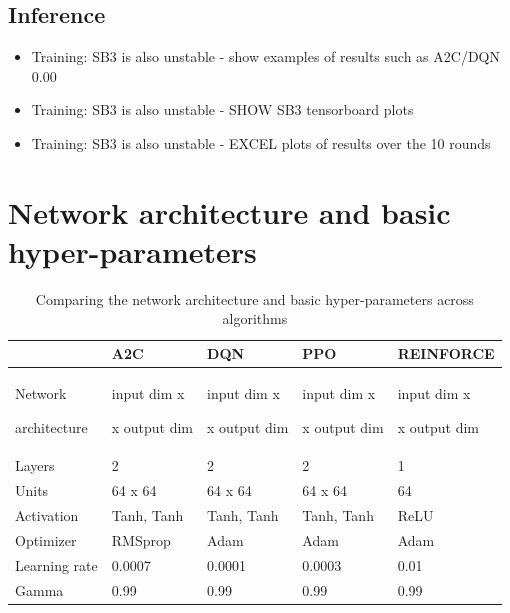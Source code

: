 \documentclass[a4paper, 12pt]{article}
\newcommand{\rowspace}[1]{\renewcommand{\arraystretch}{#1}}
\begin{document}
\subsection{Inference}
\begin{itemize}
	\item Training: SB3 is also unstable - show examples of results such as A2C/DQN 0.00 
	\item Training: SB3 is also unstable - SHOW SB3 tensorboard plots
	\item Training: SB3 is also unstable - EXCEL plots of results over the 10 rounds 	
\end{itemize}


\section{Network architecture and basic hyper-parameters}

\begin{table}\centering
	\sffamily
	\rowspace{1.5}
	\begin{tabular}{L{2cm} R{2.5cm} R{2.5cm} R{2.5cm} R{3cm}}
		\toprule
		&\textbf{A2C}&\textbf{DQN}&\textbf{PPO}&\textbf{REINFORCE}\\ \midrule
		
		Network\par architecture&input dim x\par [64|Tanh x 64|Tanh]\par x output dim&input dim x\par [64|Tanh x 64|Tanh]\par x output dim&input dim x\par [64|Tanh x 64|Tanh]\par x output dim&input dim x\par [64|ReLU]\par x output dim\\
		Layers&2&2&2&1\\
		Units&64  x 64&64  x 64&64  x 64&64\\
		Activation&Tanh, Tanh&Tanh, Tanh&Tanh, Tanh&ReLU\\
		Optimizer&RMSprop&Adam&Adam&Adam\\ \midrule
		Learning rate&0.0007&0.0001&0.0003&0.01\\
		Gamma&0.99&0.99&0.99&0.99\\			
		\bottomrule
	\end{tabular}
	\caption{Comparing the network architecture and basic hyper-parameters across algorithms}
	\label{tbl:hyperparameters}
\end{table}
\end{document}
